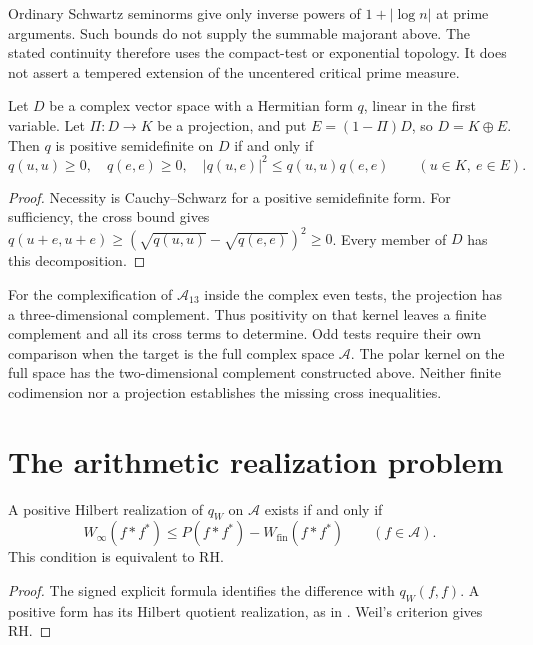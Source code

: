 \begin{remark}
\label{v4-arith:w6-b:rem:no-RH}
Ordinary Schwartz seminorms give only inverse powers of
$1+|\log n|$ at prime arguments. Such bounds do not supply the
summable majorant above. The stated continuity therefore uses the
compact-test or exponential topology. It does not assert a tempered
extension of the uncentered critical prime measure.
\end{remark}

\begin{theorem}
\label{v4-arith:w6-b:thm:residual-sharp}
Let $D$ be a complex vector space with a Hermitian form $q$,
linear in the first variable. Let $\Pi:D\to K$ be a projection,
and put $E=(1-\Pi)D$, so $D=K\oplus E$.
Then $q$ is positive semidefinite on $D$ if and only if
\[
 q(u,u)\ge0,\quad q(e,e)\ge0,\quad
 |q(u,e)|^2\le q(u,u)q(e,e)
 \qquad(u\in K,\ e\in E).
\]
\end{theorem}
\begin{proof}
Necessity is Cauchy--Schwarz for a positive semidefinite form.
For sufficiency, the cross bound gives
$q(u+e,u+e)\ge(\sqrt{q(u,u)}-\sqrt{q(e,e)})^2\ge0$.
Every member of $D$ has this decomposition.
\end{proof}

For the complexification of $\mathscr A_{13}$ inside the complex
even tests, the projection has a three-dimensional complement.
Thus positivity on that kernel leaves a finite complement and
all its cross terms to determine. Odd tests require their own
comparison when the target is the full complex space $\mathscr A$.
The polar kernel on the full space has the two-dimensional complement
constructed above. Neither finite codimension nor a projection
establishes the missing cross inequalities.

\section{The arithmetic realization problem}
\label{v4-arith:w6-b:residual-obstruction}
\label{v4-arith:w6-b:form}
\label{v4-arith:w6-b:source-comparison}
\label{v4-arith:w6-b:summary}

\begin{theorem}
\label{v4-arith:w6-b:thm:wave6b-form}
A positive Hilbert realization of $q_W$ on $\mathscr A$ exists
if and only if
\begin{equation}
\label{v4-arith:w6-b:eq:A-TP-reduced}
 W_\infty(f*f^*)\le P(f*f^*)-W_{\mathrm{fin}}(f*f^*)
 \qquad(f\in\mathscr A).
\end{equation}
This condition is equivalent to RH.
\end{theorem}
\begin{proof}
The signed explicit formula identifies the difference with
$q_W(f,f)$. A positive form has its Hilbert quotient realization,
as in . Weil's criterion gives RH.
\end{proof}

